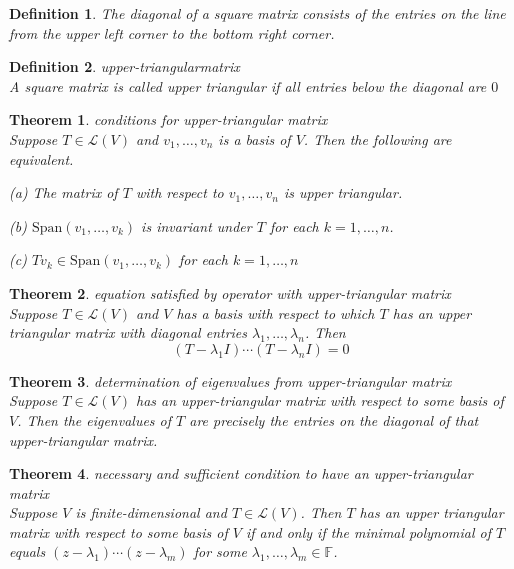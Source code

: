 \documentclass{article}
\newtheorem{theorem}{Theorem}[subsection]
\newtheorem{definition}{Definition}[subsection]
\newcommand{\FF}{\mathbb{F}}
\newcommand{\spans}{\text{Span}}
\begin{document}
\begin{CJK}{UTF8}{gkai}
\begin{definition}
    The diagonal of a square matrix consists of the entries on the line from the upper left corner to the bottom right corner.
\end{definition}

\begin{definition}
    upper-triangularmatrix\\

    A square matrix is called upper triangular if all entries below the diagonal are $0$
\end{definition}

\begin{theorem}
    conditions for upper-triangular matrix\\

    Suppose $T \in \mathcal{L}(V)$ and $v_1,\ldots,v_n$ is a basis of $V$. Then the following are equivalent.

    (a) The matrix of $T$ with respect to $v_1,\ldots,v_n$ is upper triangular.

    (b) $\spans(v_1,\ldots,v_k)$ is invariant under $T$ for each $k = 1,\ldots,n$.

    (c) $Tv_k \in \spans(v_1,\ldots,v_k)$ for each $k = 1,\ldots,n$
\end{theorem}

\begin{theorem}
    equation satisfied by operator with upper-triangular matrix\\

    Suppose $T \in \mathcal{L}(V)$ and $V$ has a basis with respect to which $T$ has an upper triangular matrix with diagonal entries $\lambda_1,\ldots, \lambda_n$. Then
    \[(T - \lambda_1I)\cdots(T - \lambda_nI) = 0\]

\end{theorem}

\begin{theorem}
    determination of eigenvalues from upper-triangular matrix\\

    Suppose $T \in \mathcal{L}(V)$ has an upper-triangular matrix with respect to some basis of $V$. Then the eigenvalues of $T$ are precisely the entries on the diagonal of that upper-triangular matrix.
\end{theorem}

\begin{theorem}
    necessary and sufficient condition to have an upper-triangular matrix\\

    Suppose $V$ is finite-dimensional and $T \in \mathcal{L}(V)$. Then $T$ has an upper triangular matrix with respect to some basis of $V$ if and only if the minimal polynomial of $T$ equals $(z - \lambda_1)\cdots(z - \lambda_m)$ for some $\lambda_1,\ldots, \lambda_m \in \FF$.
\end{theorem}


\end{CJK}
\end{document}
